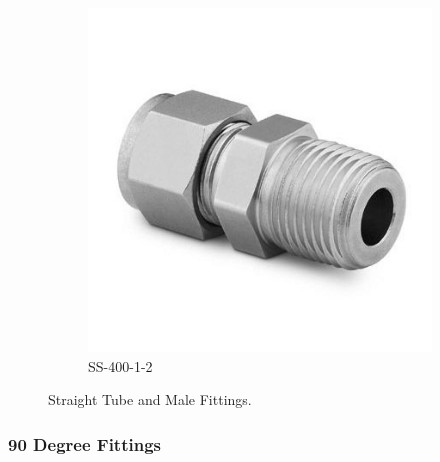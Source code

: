 \begin{figure}[H]
\begin{subfigure}[b]{0.2\textwidth}
    \includegraphics[width=\textwidth]{appendix/img/interfaces/SS-400-1-2.jpg}
    \caption{SS-400-1-2}
    \end{subfigure}
    \caption{Straight Tube and Male Fittings.}
    \label{Appx:Straight_fittings}
\end{figure}



\subsubsection{90 Degree Fittings}


